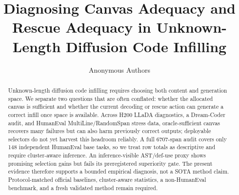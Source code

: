 \documentclass[10pt,conference]{IEEEtran}
\title{Diagnosing Canvas Adequacy and Rescue Adequacy in Unknown-Length Diffusion Code Infilling}
\author{Anonymous Authors}
\begin{document}
\maketitle
\begin{abstract}
Unknown-length diffusion code infilling requires choosing both content and generation space. We separate two questions that are often conflated: whether the allocated canvas is sufficient and whether the current decoding or rescue action can generate a correct infill once space is available. Across H200 LLaDA diagnostics, a Dream-Coder audit, and HumanEval MultiLine/RandomSpan stress data, oracle-sufficient canvas recovers many failures but can also harm previously correct outputs; deployable selectors do not yet harvest this headroom reliably. A full 6707-span audit covers only 148 independent HumanEval base tasks, so we treat row totals as descriptive and require cluster-aware inference. An inference-visible AST/def-use proxy shows promising selection gains but fails its preregistered superiority gate. The present evidence therefore supports a bounded empirical diagnosis, not a SOTA method claim. Protocol-matched official baselines, cluster-aware statistics, a non-HumanEval benchmark, and a fresh validated method remain required.
\end{abstract}











\end{document}
